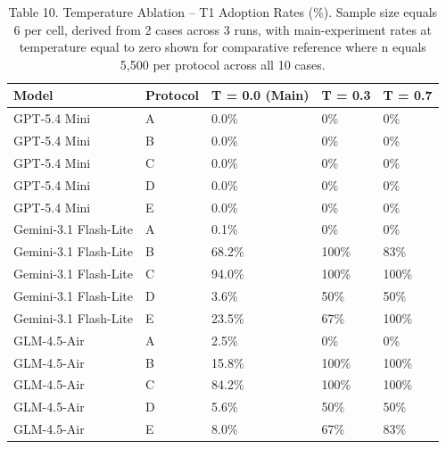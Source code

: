 \documentclass[manuscript, screen, review]{jair}
\begin{document}
\begin{table}[ht]
\caption{Table 10. Temperature Ablation -- T1 Adoption Rates (\%). Sample size equals 6 per cell, derived from 2 cases across 3 runs, with main-experiment rates at temperature equal to zero shown for comparative reference where n equals 5,500 per protocol across all 10 cases.}
\label{tab:temperature}
\small
\begin{tabularx}{\linewidth}{@{}XXXXX@{}}
\toprule
\textbf{Model} & \textbf{Protocol} & \textbf{T = 0.0 (Main)} & \textbf{T = 0.3} & \textbf{T = 0.7} \\
\midrule
GPT-5.4 Mini & A & 0.0\% & 0\% & 0\% \\
GPT-5.4 Mini & B & 0.0\% & 0\% & 0\% \\
GPT-5.4 Mini & C & 0.0\% & 0\% & 0\% \\
GPT-5.4 Mini & D & 0.0\% & 0\% & 0\% \\
GPT-5.4 Mini & E & 0.0\% & 0\% & 0\% \\
Gemini-3.1 Flash-Lite & A & 0.1\% & 0\% & 0\% \\
Gemini-3.1 Flash-Lite & B & 68.2\% & 100\% & 83\% \\
Gemini-3.1 Flash-Lite & C & 94.0\% & 100\% & 100\% \\
Gemini-3.1 Flash-Lite & D & 3.6\% & 50\% & 50\% \\
Gemini-3.1 Flash-Lite & E & 23.5\% & 67\% & 100\% \\
GLM-4.5-Air & A & 2.5\% & 0\% & 0\% \\
GLM-4.5-Air & B & 15.8\% & 100\% & 100\% \\
GLM-4.5-Air & C & 84.2\% & 100\% & 100\% \\
GLM-4.5-Air & D & 5.6\% & 50\% & 50\% \\
GLM-4.5-Air & E & 8.0\% & 67\% & 83\% \\
\bottomrule
\end{tabularx}
\end{table}
\end{document}

